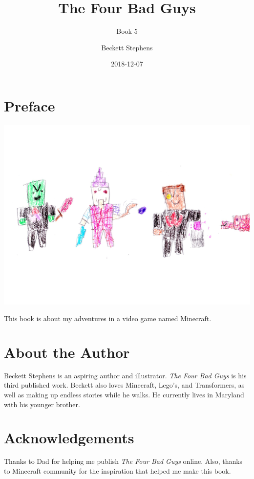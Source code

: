 \documentclass[12pt,oneside]{krantz}
\title{The Four Bad Guys}
\subtitle{Book 5}
\author{Beckett Stephens}
\date{2018-12-07}
\begin{document}
\maketitle

{
\setcounter{tocdepth}{1}
\tableofcontents
}
\hypertarget{preface}{%
\chapter*{Preface}\label{preface}}


\includegraphics[width=6.25in,height=\textheight]{img/05-four-bad-guys.jpg}

This book is about my adventures in a video game named Minecraft.

\hypertarget{about-the-author}{%
\chapter*{About the Author}\label{about-the-author}}


Beckett Stephens is an aspiring author and illustrator. \emph{The Four
Bad Guys} is his third published work. Beckett also loves Minecraft,
Lego's, and Transformers, as well as making up endless stories while he
walks. He currently lives in Maryland with his younger brother.

\hypertarget{acknowledgements}{%
\chapter*{Acknowledgements}\label{acknowledgements}}


Thanks to Dad for helping me publish \emph{The Four Bad Guys} online.
Also, thanks to Minecraft community for the inspiration that helped me
make this book.
\end{document}
